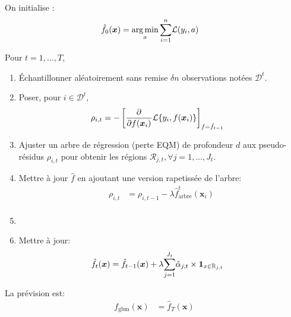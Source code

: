 \documentclass[10pt, french]{article}
\begin{document}
\begin{multicols*}{3}
\begin{definitionNOHFILL}

\end{definitionNOHFILL}

\begin{algo2}
On initialise :
\begin{align*}
	\hat{f}_{0}(\bm{x})	&=	\operatorname*{arg\,min}_{a} \overset{n}{\underset{i = 1}{\sum}} \mathcal{L}(y_{i}, a)
\end{align*}

Pour $t = 1, \dots, T$,
\begin{enumerate}[leftmargin  = *]
	\item	Échantillonner aléatoirement sans remise $\delta n$ observations notées $\mathcal{D}^{t}$.
	\item	Poser, pour $i \in \mathcal{D}^{t}$, 
		\begin{align*}
		\rho_{i, t}
		&=	-\left[ 
				\frac{\partial^{}}{\partial f(\bm{x}_{i})^{}} \mathcal{L}\{y_{i}, f(\bm{x}_{i})\}
			\right]_{f = \hat{f}_{t - 1}}
		\end{align*}
	\item	Ajuster un arbre de régression (perte EQM) de profondeur $d$ aux pseudo-résidus $\rho_{i, t}$ pour obtenir les régions $\mathcal{R}_{j, t}, \forall j = 1, \dots, J_{t}$.
	\item	Mettre à jour $\hat{f}$ en ajoutant une version rapetissée de l'arbre:
		\begin{align*}
		\rho_{i, t}	&=	\rho_{i, t - 1} - \lambda \hat{f}^{t}_{\text{arbre}}(\bm{x}_{i})	\\
		\end{align*}
	\item	
	\item	Mettre à jour:
		\begin{align*}
		\hat{f}_{t}(\bm{x})	
		&=	\hat{f}_{t - 1}(\bm{x}) + \lambda \overset{J_{t}}{\underset{j = 1}{\sum}} \hat{\alpha}_{j, t} \times \bm{1}_{x \in \mathbb{R}_{j, t}}
		\end{align*}
\end{enumerate}

La prévision est:
\begin{align*}
	f_{\text{gbm}}(\bm{x})	
	&=	\hat{f}_{T}(\bm{x})
\end{align*}
\end{algo2}

\begin{definitionNOHFILL}

\end{definitionNOHFILL}

\end{multicols*}
\end{document}
